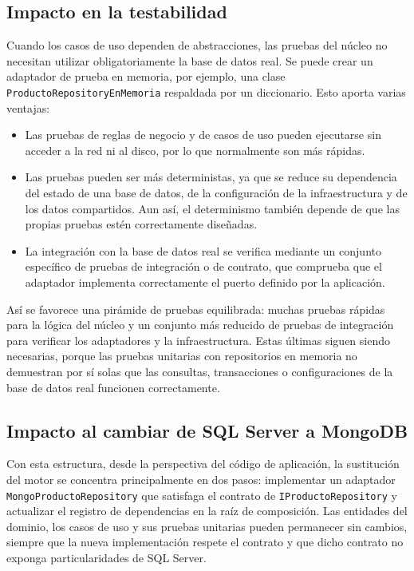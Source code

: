 \subsection{Impacto en la testabilidad}

Cuando los casos de uso dependen de abstracciones, las pruebas del núcleo no necesitan utilizar obligatoriamente la base de datos real. Se puede crear un adaptador de prueba en memoria, por ejemplo, una clase \texttt{Producto\-Repository\-EnMemoria} respaldada por un diccionario. Esto aporta varias ventajas:

\begin{itemize}
    \item Las pruebas de reglas de negocio y de casos de uso pueden ejecutarse sin acceder a la red ni al disco, por lo que normalmente son más rápidas.

    \item Las pruebas pueden ser más deterministas, ya que se reduce su dependencia del estado de una base de datos, de la configuración de la infraestructura y de los datos compartidos. Aun así, el determinismo también depende de que las propias pruebas estén correctamente diseñadas.

    \item La integración con la base de datos real se verifica mediante un conjunto específico de pruebas de integración o de contrato, que comprueba que el adaptador implementa correctamente el puerto definido por la aplicación.
\end{itemize}

Así se favorece una pirámide de pruebas equilibrada: muchas pruebas rápidas para la lógica del núcleo y un conjunto más reducido de pruebas de integración para verificar los adaptadores y la infraestructura. Estas últimas siguen siendo necesarias, porque las pruebas unitarias con repositorios en memoria no demuestran por sí solas que las consultas, transacciones o configuraciones de la base de datos real funcionen correctamente.

\subsection{Impacto al cambiar de SQL Server a MongoDB}

Con esta estructura, desde la perspectiva del código de aplicación, la sustitución del motor se concentra principalmente en dos pasos: implementar un adaptador \texttt{Mongo\-Producto\-Repository} que satisfaga el contrato de \texttt{IProductoRepository} y actualizar el registro de dependencias en la raíz de composición. Las entidades del dominio, los casos de uso y sus pruebas unitarias pueden permanecer sin cambios, siempre que la nueva implementación respete el contrato y que dicho contrato no exponga particularidades de SQL Server.

